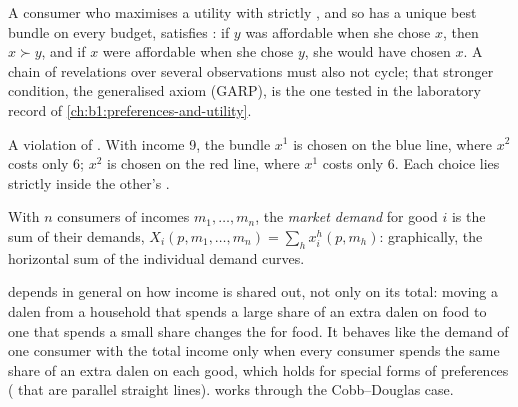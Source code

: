 A consumer who maximises a utility with strictly , and so
has a unique best bundle on every budget, satisfies : if $y$ was
affordable when she chose $x$, then $x \succ y$, and if $x$ were affordable
when she chose $y$, she would have chosen $x$. A chain of revelations over
several observations must also not cycle; that stronger condition, the
generalised axiom (GARP), is the one tested in the laboratory record of
\cref{ch:b1:preferences-and-utility}.

\begin{omfigure}

{\small A violation of . With income 9, the bundle $x^1$ is chosen on the
blue line, where $x^2$ costs only 6; $x^2$ is chosen on the red line, where $x^1$
costs only 6. Each choice lies strictly inside the other's .}
\end{omfigure}

\begin{definition}\label{def:b1:consumer-choice:market-demand}
With $n$ consumers of incomes $m_1, \dots, m_n$, the \emph{market demand}
for good $i$ is the sum of their demands,
$X_i(p, m_1, \dots, m_n) = \sum_{h} x_i^h(p, m_h)$: graphically, the horizontal
sum of the individual demand curves.
\end{definition}

 depends in general on how income is shared out, not only on
its total: moving a dalen from a household that spends a large share of an
extra dalen on food to one that spends a small share changes the  for food. It behaves like the demand of one consumer with the total
income only when every consumer spends the same share of an extra dalen
on each good, which holds for special forms of preferences (
that are parallel straight lines).  works through the Cobb--Douglas case.

